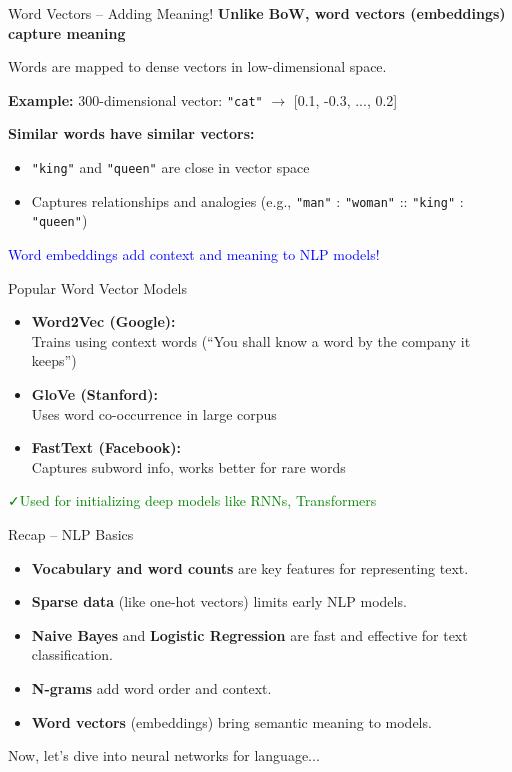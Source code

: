 \begin{frame}{Word Vectors – Adding Meaning!}
    \textbf{Unlike BoW, word vectors (embeddings) capture meaning}

    \vspace{1em}
    Words are mapped to dense vectors in low-dimensional space.

    \vspace{1em}
    \textbf{Example:} 300-dimensional vector: \texttt{"cat"} $\rightarrow$ [0.1, -0.3, ..., 0.2]

    \vspace{1em}
    \textbf{Similar words have similar vectors:}
    \begin{itemize}
        \item \texttt{"king"} and \texttt{"queen"} are close in vector space
        \item Captures relationships and analogies (e.g., \texttt{"man"} : \texttt{"woman"} :: \texttt{"king"} : \texttt{"queen"})
    \end{itemize}

    \vspace{1em}
    \textcolor{blue}{\faLightbulbO\enspace Word embeddings add context and meaning to NLP models!}
\end{frame}

\begin{frame}{Popular Word Vector Models}
    \begin{itemize}
        \item \textbf{Word2Vec (Google):} \\
        Trains using context words (“You shall know a word by the company it keeps”)
        \item \textbf{GloVe (Stanford):} \\
        Uses word co-occurrence in large corpus
        \item \textbf{FastText (Facebook):} \\
        Captures subword info, works better for rare words
    \end{itemize}
    \vspace{1em}
    \textcolor{green}{\faCheck\enspace Used for initializing deep models like RNNs, Transformers}
\end{frame}

\begin{frame}{Recap – NLP Basics}
    \begin{itemize}
        \item \textbf{Vocabulary and word counts} are key features for representing text.
        \item \textbf{Sparse data} (like one-hot vectors) limits early NLP models.
        \item \textbf{Naive Bayes} and \textbf{Logistic Regression} are fast and effective for text classification.
        \item \textbf{N-grams} add word order and context.
        \item \textbf{Word vectors} (embeddings) bring semantic meaning to models.
    \end{itemize}
    \vspace{1em}
    Now, let’s dive into neural networks for language...
\end{frame}
